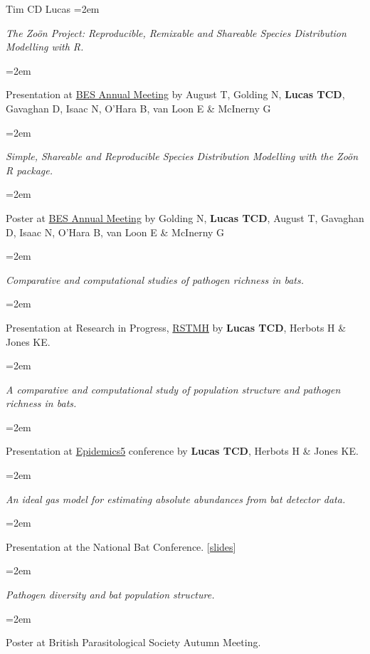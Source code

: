 \documentclass{scrartcl}
\newcommand{\MarginText}[1]{\marginpar{\raggedleft\itshape\small#1}} %
\newcommand{\Description}[1]{\hangindent=2em\hangafter=0\noindent\raggedright\footnotesize{#1}\par\normalsize\vspace{1em}} %
\newcommand{\MoreDescription}[1]{\hangindent=2em\hangafter=0\noindent\raggedright\scriptsize{#1}\par\normalsize\vspace{1em}} %
\begin{document}
\begin{cv}{Tim {\Large CD} Lucas}
\Description{\MarginText{2015}\emph{The Zo\"{o}n Project: Reproducible, Remixable and Shareable Species Distribution Modelling with R.}}\vspace{-1em}
\MoreDescription{Presentation at \href{http://www.britishecologicalsociety.org/events/current_future_meetings/past-bes-annual-meetings/2015-annual-meeting/}{BES Annual Meeting} by August T, Golding N, \textbf{Lucas TCD}, Gavaghan D, Isaac N, O'Hara B, van Loon E \& McInerny G }

\vspace{-0.5em}


\Description{\emph{Simple, Shareable and Reproducible Species Distribution Modelling with the Zo\"{o}n R package.}}\vspace{-1em}
\MoreDescription{Poster at \href{http://www.britishecologicalsociety.org/events/current_future_meetings/past-bes-annual-meetings/2015-annual-meeting/}{BES Annual Meeting} by Golding N, \textbf{Lucas TCD}, August T, Gavaghan D, Isaac N, O'Hara B, van Loon E \& McInerny G}

\vspace{-0.5em}

\Description{\emph{Comparative and computational studies of pathogen richness in bats.}}\vspace{-1em}
\MoreDescription{Presentation at Research in Progress, \href{https://rstmh.org/events/research-progress-2015}{RSTMH} by \textbf{Lucas TCD}, Herbots H \& Jones KE.}

\vspace{-0.5em}

\Description{\emph{A comparative and computational study of population structure and pathogen richness in bats.}}\vspace{-1em}
\MoreDescription{Presentation at \href{http://www.epidemics.elsevier.com/}{Epidemics5} conference by \textbf{Lucas TCD}, Herbots H \& Jones KE.}

\vspace{-0.5em}



\Description{\emph{An ideal gas model for estimating absolute abundances from bat detector data.}}\vspace{-1em}
\MoreDescription{Presentation at the National Bat Conference. [\href{http://www.slideshare.net/timcdlucas/tim-lucasnbc}{slides}]}

\vspace{-0.5em}

\Description{\emph{Pathogen diversity and bat population structure.}}\vspace{-1em}
\MoreDescription{Poster at British Parasitological Society Autumn Meeting.}



\end{cv}
\end{document}
